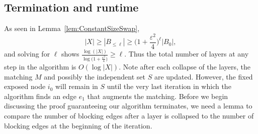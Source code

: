 

\subsection{Termination and runtime}



  As seen in Lemma~\ref{lem:ConstantSizeSwap}, 
\[
|X| \geq |B_{\leq \ell}|\geq \big(1+\frac{\varepsilon^2}{4} \big)^{\ell}|B_0|,
\]
and solving for $\ell$ shows $\frac{\log(|X|)}{\log \big(1+\frac{\varepsilon^2 }{4} \big)}  \geq \ell$.
Thus the total number of layers at any step in the algorithm is $O(\log|X|)$. 
Note after each collapse of the layers, the matching $M$ and possibly the independent set $S$ are updated. 
However, the fixed exposed node $i_0$ will remain in $S$ until the very last iteration in which the algorithm finds
an edge $e_1$ that augments the matching. 
Before we begin discussing the proof guaranteeing our algorithm terminates, we need a lemma to compare the number of blocking edges after a layer is collapsed to the number of blocking edges at the beginning of the iteration. 

